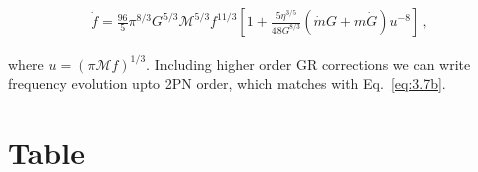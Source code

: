 \documentclass[11pt]{article}
\begin{document}
 \begin{align} 
 \dot{f}=\frac{96}{5}\pi^{8/3}G^{5/3}\mathcal{M}^{5/3}f^{11/3}[1+\frac{5\eta^{3/5}}{48 G^{8/3}}(\dot{m}G+m\dot{G})u^{-8}]\,,
 \end{align} 
 
 
 where $u=(\pi \mathcal{M}f)^{1/3}$. Including higher order GR corrections we can write frequency evolution upto 2PN order, which matches with Eq.~\eqref{eq:3.7b}.
 
 
  \newpage
 \section{Table}
\end{document}
